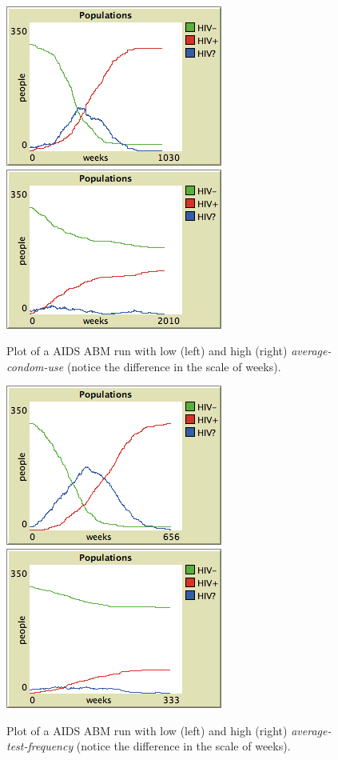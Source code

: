\begin{figure}[ht]
\centering
\includegraphics[scale=.666667]{images/condom_low.png}
\includegraphics[scale=.666667]{images/condom_high.png}
\caption{Plot of a AIDS ABM run with low (left) and high (right) \textit{average-condom-use} (notice the difference in the scale of weeks).}
\label{fig:aids_condom}
\end{figure}

\begin{figure}[ht]
\centering
\includegraphics[scale=.666667]{images/test_low.png}
\includegraphics[scale=.666667]{images/test_high.png}
\caption{Plot of a AIDS ABM run with low (left) and high (right) \textit{average-test-frequency} (notice the difference in the scale of weeks).}
\label{fig:aids_test}
\end{figure}


